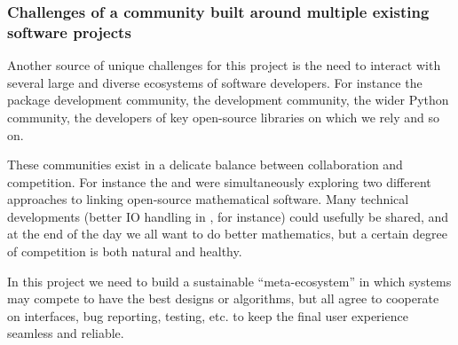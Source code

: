 \subsubsection{Challenges of a community built around multiple
  existing software projects}

Another source of unique challenges for this project is the need to
interact with several large and diverse ecosystems of software
developers. For instance the \GAP package development community, the
\Sage development community, the wider Python community, the developers
of key open-source libraries on which we rely and so on.

These communities exist in a delicate balance between collaboration
and competition. For instance the \scienceproject and \Sage were
simultaneously exploring two different approaches to linking
open-source mathematical software. Many technical developments (better
IO handling in \GAP, for instance) could usefully be shared, and at
the end of the day we all want to do better mathematics, but a certain
degree of competition is both natural and healthy.

In this project we need to build a sustainable ``meta-ecosystem'' in
which systems may compete to have the best designs or algorithms, but
all agree to cooperate on interfaces, bug reporting, testing, etc. to
keep the final user experience seamless and reliable.



